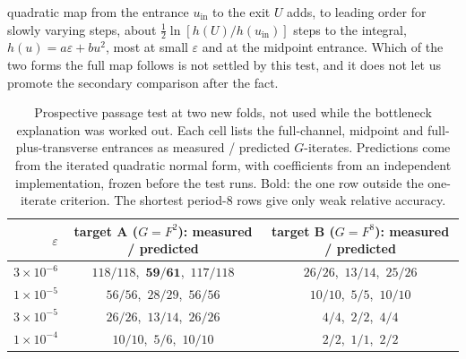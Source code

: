 \documentclass[11pt,letterpaper]{article}
\newcommand{\eps}{\varepsilon}
\begin{document}
quadratic map from the entrance $u_{\mathrm{in}}$ to the exit $U$ adds, to leading order for slowly varying steps, about $\tfrac12\ln[h(U)/h(u_{\mathrm{in}})]$ steps to the integral,
$h(u)=a\eps+bu^2$, most at small $\eps$ and at the midpoint entrance. Which of the two forms
the full map follows is not settled by this test, and it does not let us promote the secondary comparison after the
fact.
\begin{table}[H]
\centering\small
\begin{tabular}{rcc}
\toprule
$\eps$ & target A ($G=F^2$): measured / predicted & target B ($G=F^8$): measured / predicted \\
\midrule
$3\times10^{-6}$ & $118/118$,\ $\mathbf{59/61}$,\ $117/118$ & $26/26$,\ $13/14$,\ $25/26$ \\
$1\times10^{-5}$ & $56/56$,\ $28/29$,\ $56/56$ & $10/10$,\ $5/5$,\ $10/10$ \\
$3\times10^{-5}$ & $26/26$,\ $13/14$,\ $26/26$ & $4/4$,\ $2/2$,\ $4/4$ \\
$1\times10^{-4}$ & $10/10$,\ $5/6$,\ $10/10$ & $2/2$,\ $1/1$,\ $2/2$ \\
\bottomrule
\end{tabular}
\caption{Prospective passage test at two new folds, not used while the bottleneck explanation was worked out. Each cell lists the full-channel,
midpoint and full-plus-transverse entrances as measured / predicted $G$-iterates. Predictions come from the iterated
quadratic normal form, with coefficients from an independent implementation, frozen before the test runs. Bold: the
one row outside the one-iterate criterion. The shortest period-8 rows give only weak relative accuracy.}
\label{tab:prospective}
\end{table}
\end{document}
